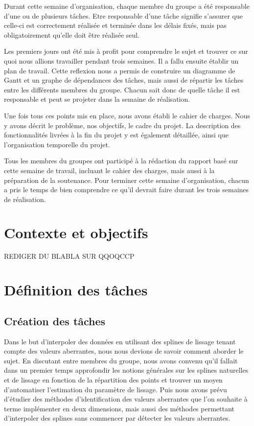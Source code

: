 \documentclass[a4paper,10pt]{article} %
\begin{document}
Durant cette semaine d'organisation, chaque membre du groupe a été responsable d’une ou de plusieurs tâches. Etre responsable d'une tâche signifie s'assurer que celle-ci est correctement réalisée et terminée dans les délais fixés, mais pas obligatoirement qu'elle doit être réalisée seul.

Les premiers jours ont été mis à profit pour comprendre le sujet et trouver ce sur quoi nous allions travailler pendant trois semaines. Il a fallu ensuite établir un plan de travail. Cette reflexion nous a permis de construire un diagramme de Gantt et un graphe de dépendances des tâches, mais aussi de répartir les tâches entre les différents membres du groupe. Chacun sait donc de quelle tâche il est responsable et peut se projeter dans la semaine de réalisation.

Une fois tous ces points mis en place, nous avons établi le cahier de charges. Nous y avons décrit le problème, nos objectifs, le cadre du projet. La description des fonctionnalités livrées à la fin du projet y est également détaillée, ainsi que l'organisation temporelle du projet. 

Tous les membres du groupes ont participé à la rédaction du rapport basé sur cette semaine de travail, incluant le cahier des charges, mais aussi à la préparation de la soutenance. Pour terminer cette semaine d'organisation, chacun a pris le temps de bien comprendre ce qu'il devrait faire durant les trois semaines de réalisation. 
\newpage
\section{Contexte et objectifs}
	REDIGER DU BLABLA SUR QQOQCCP

\section{Définition des tâches}

	\subsection{Création des tâches}
	Dans le but d'interpoler des données en utilisant des splines de lissage tenant compte des valeurs aberrantes, nous nous devions de savoir comment aborder le sujet. En discutant entre membres du groupe, nous avons convenu qu'il fallait dans un premier temps approfondir les notions générales sur les splines naturelles et de lissage en fonction de la répartition des points et trouver un moyen d'automatiser l'estimation du paramètre de lissage. Puis nous avons prévu d'étudier des méthodes d'identification des valeurs aberrantes que l'on souhaite à terme implémenter en deux dimensions, mais aussi des méthodes permettant d'interpoler des splines sans commencer par détecter les valeurs aberrantes.
\newpage
\end{document}
